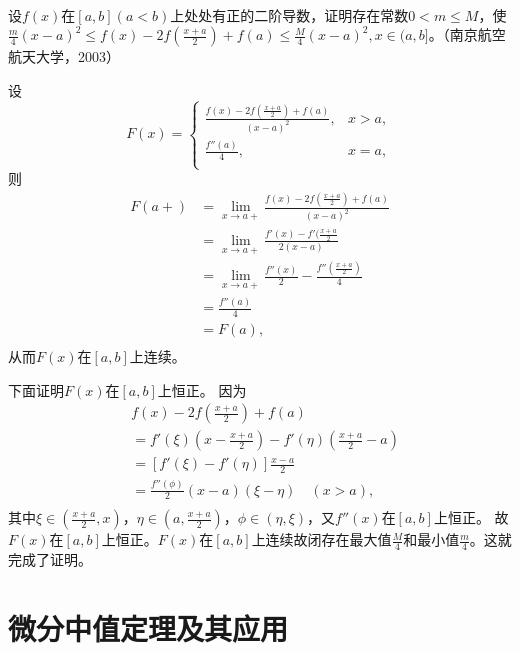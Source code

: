  \begin{exercise}
  \hfill\\
 设$f(x)$在$[a,b](a<b)$上处处有正的二阶导数，证明存在常数$0<m\leq M$，使$\frac m4(x-a)^2\leq f(x)-2f(\frac{x+a}2)+f(a)\leq \frac M4(x-a)^2,x\in(a,b]$。（南京航空航天大学，2003） 
  
  设$$F(x)=
  \begin{cases}
  \frac{f(x)-2f(\frac{x+a}{2})+f(a)}{(x-a)^2},&x>a,\\
  \frac{f''(a)}{4},&x=a,\\
  \end{cases}
  $$
  则
  \begin{align*}
  F(a+)&=\lim_{x\rightarrow a+}\frac{f(x)-2f(\frac{x+a}{2})+f(a)}{(x-a)^2}\\
  &=\lim_{x\rightarrow a+}\frac{f'(x)-f'(\frac{x+a}{2}}{2(x-a)}\\
  &=\lim_{x\rightarrow a+}\frac{f''(x)}{2}-\frac{f''(\frac{x+a}{2})}{4}\\
  &=\frac{f''(a)}{4}\\
  &=F(a),\\
  \end{align*}
  从而$F(x)$在$[a,b]$上连续。
  
  下面证明$F(x)$在$[a,b]$上恒正。
 因为
 \begin{align*}
 &f(x)-2f(\frac{x+a}{2})+f(a)\\
 &=f'(\xi)(x-\frac{x+a}{2})-f'(\eta)(\frac{x+a}{2}-a)\\
 &=[f'(\xi)-f'(\eta)]\frac{x-a}{2}\\
 &=\frac{f''(\phi)}2(x-a)(\xi-\eta)\quad(x>a),\\
 \end{align*}
 其中$\xi\in(\frac{x+a}{2},x)$，$\eta\in(a,\frac{x+a}{2})$，$\phi\in(\eta,\xi)$，又$f''(x)$在$[a,b]$上恒正。
 故$F(x)$在$[a,b]$上恒正。$F(x)$在$[a,b]$上连续故闭存在最大值$\frac{M}{4}$和最小值$\frac{m}{4}$。这就完成了证明。  
  \end{exercise}  

  \section{微分中值定理及其应用}

